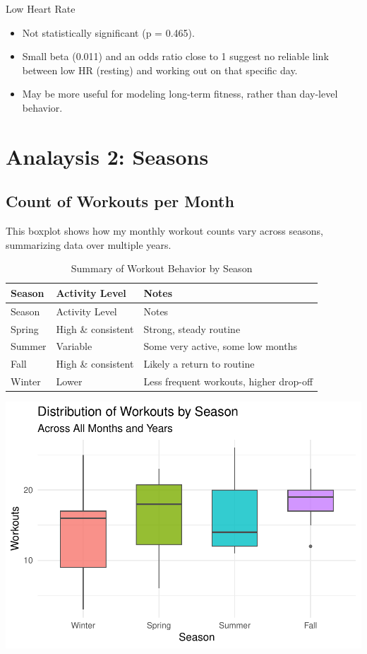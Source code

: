 \documentclass[
  11pt,
]{article}
\providecommand{\tightlist}{%
  \setlength{\itemsep}{0pt}\setlength{\parskip}{0pt}}
\begin{document}
Low Heart Rate

\begin{itemize}
\tightlist
\item
  Not statistically significant (p = 0.465).
\item
  Small beta (0.011) and an odds ratio close to 1 suggest no reliable
  link between low HR (resting) and working out on that specific day.
\item
  May be more useful for modeling long-term fitness, rather than
  day-level behavior.
\end{itemize}

\section{Analaysis 2: Seasons}\label{analaysis-2-seasons}

\subsection{Count of Workouts per
Month}\label{count-of-workouts-per-month}

This boxplot shows how my monthly workout counts vary across seasons,
summarizing data over multiple years.

\begin{longtable}[]{@{}lll@{}}
\caption{Summary of Workout Behavior by Season}\tabularnewline
\toprule\noalign{}
Season & Activity Level & Notes \\
\midrule\noalign{}
\endfirsthead
\toprule\noalign{}
Season & Activity Level & Notes \\
\midrule\noalign{}
\endhead
\bottomrule\noalign{}
\endlastfoot
Spring & High \& consistent & Strong, steady routine \\
Summer & Variable & Some very active, some low months \\
Fall & High \& consistent & Likely a return to routine \\
Winter & Lower & Less frequent workouts, higher drop-off \\
\end{longtable}

\includegraphics{analysis_files/figure-latex/unnamed-chunk-14-1.pdf}
\end{document}
